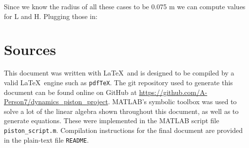 \documentclass[nofoot,pdf-a,balance,colorlinks,upint,subscriptcorrection,varvw,mathalfa=cal=boondoxo]{asmeconf}
\begin{document}
	Since we know the radius of all these cases to be 0.075 m we can compute values for L and H. Plugging those in:
\begin{table}[H]
        \caption[Table]{Cases to consider (Absolute)}\label{tab:absCases}
    \end{table}


    

    

    \section{Sources}\label{appendix:sources} 

    This document was written with \LaTeX\ and is designed to be compiled by a valid \LaTeX\ engine such as \texttt{pdfTeX}. The git repository used to generate this document can be found online on GitHub at \href{https://github.com/A-Person7/dynamics_piston_project}{https://github.com/A-Person7/dynamics_piston_project}. MATLAB's symbolic toolbox was used to solve a lot of the linear algebra shown throughout this document, as well as to generate equations. These were implemented in the MATLAB script file \texttt{piston_script.m}. Compilation instructions for the final document are provided in the plain-text file \texttt{README}.


    
\end{document}
